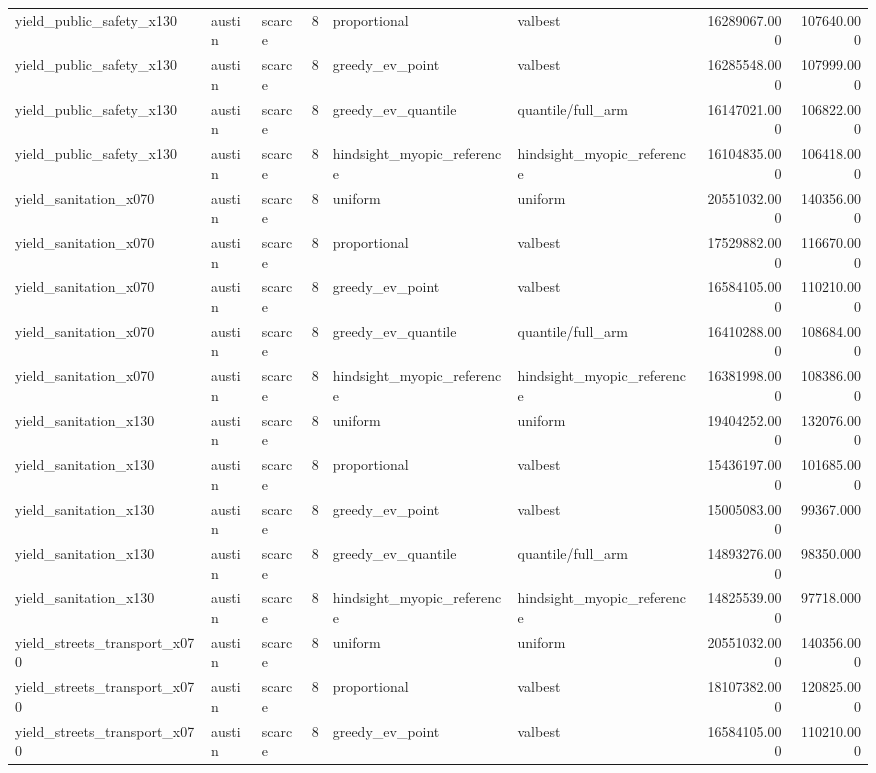\begin{tabular}{lllrllrr}
yield\_public\_safety\_x130 & austin & scarce & 8 & proportional & valbest & 16289067.000 & 107640.000 \\
yield\_public\_safety\_x130 & austin & scarce & 8 & greedy\_ev\_point & valbest & 16285548.000 & 107999.000 \\
yield\_public\_safety\_x130 & austin & scarce & 8 & greedy\_ev\_quantile & quantile/full\_arm & 16147021.000 & 106822.000 \\
yield\_public\_safety\_x130 & austin & scarce & 8 & hindsight\_myopic\_reference & hindsight\_myopic\_reference & 16104835.000 & 106418.000 \\
yield\_sanitation\_x070 & austin & scarce & 8 & uniform & uniform & 20551032.000 & 140356.000 \\
yield\_sanitation\_x070 & austin & scarce & 8 & proportional & valbest & 17529882.000 & 116670.000 \\
yield\_sanitation\_x070 & austin & scarce & 8 & greedy\_ev\_point & valbest & 16584105.000 & 110210.000 \\
yield\_sanitation\_x070 & austin & scarce & 8 & greedy\_ev\_quantile & quantile/full\_arm & 16410288.000 & 108684.000 \\
yield\_sanitation\_x070 & austin & scarce & 8 & hindsight\_myopic\_reference & hindsight\_myopic\_reference & 16381998.000 & 108386.000 \\
yield\_sanitation\_x130 & austin & scarce & 8 & uniform & uniform & 19404252.000 & 132076.000 \\
yield\_sanitation\_x130 & austin & scarce & 8 & proportional & valbest & 15436197.000 & 101685.000 \\
yield\_sanitation\_x130 & austin & scarce & 8 & greedy\_ev\_point & valbest & 15005083.000 & 99367.000 \\
yield\_sanitation\_x130 & austin & scarce & 8 & greedy\_ev\_quantile & quantile/full\_arm & 14893276.000 & 98350.000 \\
yield\_sanitation\_x130 & austin & scarce & 8 & hindsight\_myopic\_reference & hindsight\_myopic\_reference & 14825539.000 & 97718.000 \\
yield\_streets\_transport\_x070 & austin & scarce & 8 & uniform & uniform & 20551032.000 & 140356.000 \\
yield\_streets\_transport\_x070 & austin & scarce & 8 & proportional & valbest & 18107382.000 & 120825.000 \\
yield\_streets\_transport\_x070 & austin & scarce & 8 & greedy\_ev\_point & valbest & 16584105.000 & 110210.000 \\

\end{tabular}
